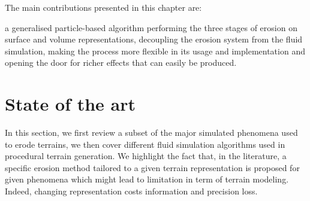 The main contributions presented in this chapter are:
\begin{Itemize}
    \Item{} a generalised particle-based algorithm performing the three
    stages of erosion on surface and volume representations,
    \Item{} decoupling the erosion system from the fluid simulation, making the process more flexible in its usage and implementation and opening the door for richer effects that can easily be produced.
\end{Itemize}


\section{State of the art}
\label{sec:erosion-state_of_the_art}
In this section, we first review a subset of the major simulated phenomena used to erode terrains, we then cover different fluid simulation algorithms used in procedural terrain generation. We highlight the fact that, in the literature, a specific erosion method tailored to a given terrain representation is proposed for given phenomena which might lead to limitation in term of terrain modeling. Indeed, changing representation costs information and precision loss.





